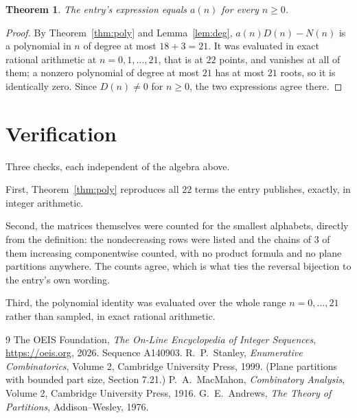 \documentclass[11pt,a4paper]{article}
\theoremstyle{plain}
\newtheorem{theorem}{Theorem}
\theoremstyle{definition}
\begin{document}
\begin{theorem}
The entry's expression equals $a(n)$ for every $n\ge0$.
\end{theorem}

\begin{proof}
By Theorem~\ref{thm:poly} and Lemma~\ref{lem:deg}, $a(n)D(n)-N(n)$ is a polynomial in $n$
of degree at most $18+3=21$. It was evaluated in exact rational arithmetic at
$n=0,1,\dots,21$, that is at $22$ points, and vanishes at all of them; a nonzero polynomial
of degree at most $21$ has at most $21$ roots, so it is identically zero. Since $D(n)\neq0$
for $n\ge0$, the two expressions agree there.
\end{proof}

\section{Verification}

Three checks, each independent of the algebra above.

First, Theorem~\ref{thm:poly} reproduces all $22$ terms the entry publishes,
exactly, in integer arithmetic.

Second, the matrices themselves were counted for the smallest alphabets, directly from the
definition: the nondecreasing rows were listed and the chains of $3$ of them increasing
componentwise counted, with no product formula and no plane partitions anywhere. The counts
agree, which is what ties the reversal bijection to the entry's own wording.

Third, the polynomial identity was evaluated over the whole range $n=0,\dots,21$ rather than
sampled, in exact rational arithmetic.

\begin{thebibliography}{9}
 The OEIS Foundation, \emph{The On-Line Encyclopedia of Integer
Sequences}, \url{https://oeis.org}, 2026. Sequence A140903.
 R.~P.~Stanley, \emph{Enumerative Combinatorics}, Volume 2, Cambridge
University Press, 1999. (Plane partitions with bounded part size, Section 7.21.)
 P.~A.~MacMahon, \emph{Combinatory Analysis}, Volume 2, Cambridge
University Press, 1916.
 G.~E.~Andrews, \emph{The Theory of Partitions}, Addison--Wesley, 1976.
\end{thebibliography}
\end{document}
